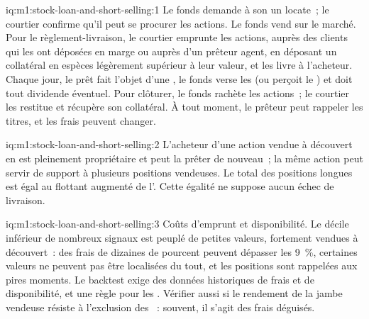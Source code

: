 \begin{solution}{iq:m1:stock-loan-and-short-selling:1}
Le fonds demande à son  un locate~; le courtier confirme qu'il peut
se procurer les actions. Le fonds vend sur le marché. Pour le règlement-livraison, le courtier
emprunte les actions, auprès des clients qui les ont déposées en marge ou auprès d'un prêteur
agent, en déposant un collatéral en espèces légèrement supérieur à leur valeur, et
les livre à l'acheteur. Chaque jour, le prêt fait l'objet d'une , le fonds
verse les  (ou perçoit le ) et doit tout dividende éventuel. Pour clôturer, le fonds
rachète les actions~; le courtier les restitue et récupère son collatéral. À tout
moment, le prêteur peut rappeler les titres, et les frais peuvent changer.
\end{solution}

\begin{solution}{iq:m1:stock-loan-and-short-selling:2}
L'acheteur d'une action vendue à découvert en est pleinement propriétaire et peut la prêter de nouveau~; la même
action peut servir de support à plusieurs positions vendeuses. Le total des positions longues est égal au
flottant augmenté de l'. Cette égalité ne suppose aucun échec de livraison.
\end{solution}

\begin{solution}{iq:m1:stock-loan-and-short-selling:3}
Coûts d'emprunt et disponibilité. Le décile inférieur de nombreux signaux est
peuplé de petites valeurs, fortement vendues à découvert~: des frais de dizaines de pourcent peuvent
dépasser les 9~\%, certaines valeurs ne peuvent pas être localisées du tout, et les positions sont
rappelées aux pires moments. Le backtest exige des données historiques de frais et
de disponibilité, et une règle pour les . Vérifier aussi si le rendement de la jambe
vendeuse résiste à l'exclusion des ~: souvent, il s'agit des frais déguisés.
\end{solution}

